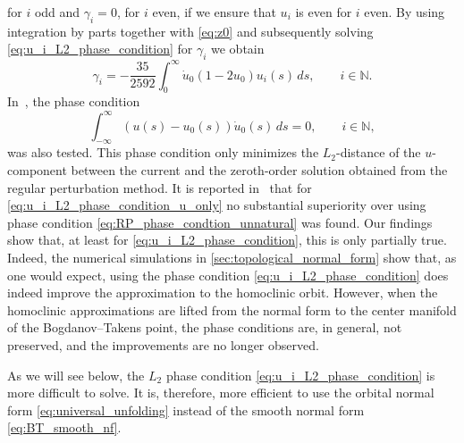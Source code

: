 for $i$ odd and $\gamma_i=0$, for $i$ even, if we ensure that $u_i$ is even for $i$
even. By using integration by parts together with \cref{eq:z0} and subsequently
solving \cref{eq:u_i_L2_phase_condition} for $\gamma_i$ we obtain
\begin{equation}
    \label{eq:c_i}
    \gamma_i = -\frac{35}{2592} 
            \int_0^\infty \dot u_0(1 - 2 u_0)u_{i}(s) \, ds,
        \qquad i \in \mathbb{N}.
\end{equation}
In~\cite{Kuznetsov2014improved}, the phase condition
\begin{equation}
     \label{eq:u_i_L2_phase_condition_u_only}
     \int_{-\infty}^\infty \left( u(s) - u_0(s) \right) \dot u_0(s) \, ds
     = 0,
    \qquad i \in \mathbb N,
\end{equation}
was also tested. This phase condition only minimizes the $L_2$-distance of the
$u$-component between the current and the zeroth-order solution obtained from
the regular perturbation method. It is reported in~\cite{Kuznetsov2014improved}
that for \cref{eq:u_i_L2_phase_condition_u_only} no substantial superiority
over using phase condition \cref{eq:RP_phase_condtion_unnatural} was found.
Our findings show that, at least for \cref{eq:u_i_L2_phase_condition}, this is
only partially true.  Indeed, the numerical simulations in
\cref{sec:topological_normal_form} show that, as one would expect, using the
phase condition \cref{eq:u_i_L2_phase_condition} does indeed improve the
approximation to the homoclinic orbit. However, when the homoclinic
approximations are lifted from the normal form to the center manifold of the
Bogdanov--Takens point, the phase conditions are, in general, not preserved, and
the improvements are no longer observed.

As we will see below, the $L_2$ phase condition
\cref{eq:u_i_L2_phase_condition} is more difficult to solve. It is, therefore,
more efficient to use the orbital normal form \cref{eq:universal_unfolding}
instead of the smooth normal form \cref{eq:BT_smooth_nf}.

